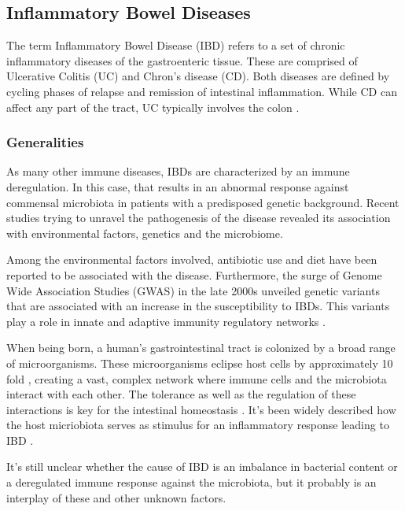 \documentclass[../main.tex]{subfiles}
\begin{document}
\subsection{Inflammatory Bowel Diseases}

The term Inflammatory Bowel Disease (IBD) refers to a set of chronic inflammatory diseases of the gastroenteric tissue. These are comprised of Ulcerative Colitis (UC) and Chron's disease (CD). Both diseases are defined by cycling phases of relapse and remission of intestinal inflammation. While CD can affect any part of the tract, UC typically involves the colon \citep{wallace_immunopathology_2014}. 

\subsubsection{Generalities}
As many other immune diseases, IBDs are characterized by an immune deregulation. In this case, that results in an abnormal response against commensal microbiota in patients with a predisposed genetic background. Recent studies trying to unravel the pathogenesis of the disease revealed its association with environmental factors, genetics and the microbiome. 

Among the environmental factors involved, antibiotic use \citep{hviid_antibiotic_2011} and diet \citep{de_filippo_impact_2010} have been reported to be associated with the disease. Furthermore, the surge of Genome Wide Association Studies (GWAS) in the late 2000s unveiled genetic variants that are associated with an increase in the susceptibility to IBDs. This variants play a role in innate and adaptive immunity regulatory networks \citep{duerr_genome-wide_2006,hampe_genome-wide_2007,burton_association_2007}.  

When being born, a human's gastrointestinal tract is colonized by a broad range of microorganisms. These microorganisms eclipse host cells by approximately 10 fold \citep{saleh_experimental_2011}, creating a vast, complex network where immune cells and the microbiota interact with each other. The tolerance as well as the regulation of these interactions is key for the intestinal homeostasis \citep{nell_impact_2010}. It's been widely described how the host micriobiota serves as stimulus for an inflammatory response leading to IBD \citep{dhaens_early_1998}.  

It's still unclear whether the cause of IBD is an imbalance in bacterial content or a deregulated immune response against the microbiota, but it probably is an interplay of these and other unknown factors.  
\end{document}
